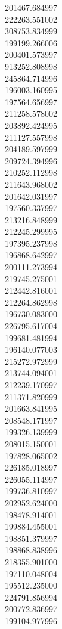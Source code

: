 201467.684997\\
222263.551002\\
308753.834999\\
199199.266006\\
200401.573997\\
913252.808998\\
245864.714996\\
196003.160995\\
197564.656997\\
211258.578002\\
203892.424995\\
211127.557998\\
204189.597999\\
209724.394996\\
210252.112998\\
211643.968002\\
201642.031997\\
197560.337997\\
213216.848999\\
212245.299995\\
197395.237998\\
196868.642997\\
200111.273994\\
219745.275001\\
212442.816001\\
212264.862998\\
196730.083000\\
226795.617004\\
199681.481994\\
196140.077003\\
215272.972999\\
213744.094001\\
212239.170997\\
211371.820999\\
201663.841995\\
208548.171997\\
199326.139999\\
208015.150001\\
197828.065002\\
226185.018997\\
226055.114997\\
199736.810997\\
202952.624000\\
198478.914001\\
199884.455001\\
198851.379997\\
198868.838996\\
218355.901000\\
197110.048004\\
195512.235000\\
224791.856994\\
200772.836997\\
199104.977996\\
